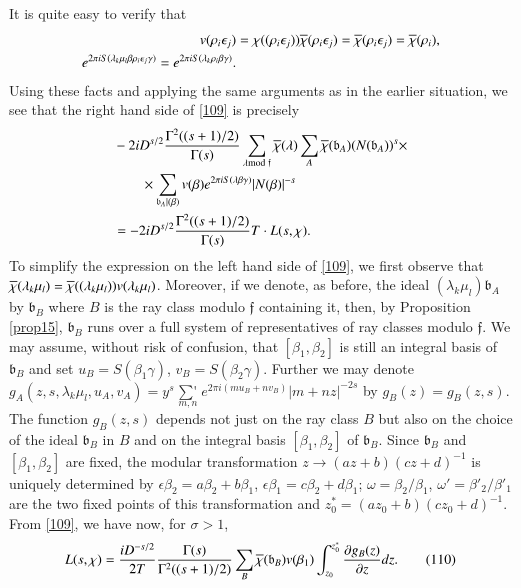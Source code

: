 It is quite easy to verify that
\begin{align*}
v(\rho_{i}\epsilon_{j}) &=
\chi((\rho_{i}\epsilon_{j}))\overline{\chi}(\rho_{i}\epsilon_{j})=\overline{\chi}(\rho_{i}\epsilon_{j})=\overline{\chi}(\rho_{i}),\\
e^{2\pi iS(\lambda_{k}\mu_{l}\beta\rho_{i}\epsilon_{j}\gamma)}=e^{2\pi
  iS(\lambda_{k}\rho_{i}\beta\gamma)}. 
\end{align*}
Using these facts and applying the same arguments as in the earlier
situation, we see that the right hand side of \eqref{109} is precisely
\begin{align*}
& -2iD^{s/2}\frac{\Gamma^{2}((s+1)/2)}{\Gamma(s)}\sum_{\lambda\rm{mod} \;
  \mathfrak{f}}\overline{\chi}(\lambda)\sum_{A}\overline{\chi}(\mathfrak{b}_{A})(N(\mathfrak{b}_{A}))^{s}\times\\
&\qquad \times\sum_{\mathfrak{b}_{A}|(\beta)}v(\beta)e^{2\pi
    iS(\lambda\beta\gamma)}|N(\beta)|^{-s}\\
&=-2iD^{s/2}\frac{\Gamma^{2}((s+1)/2)}{\Gamma(s)}T\cdot L(s,\chi).
\end{align*}\pageoriginale
To simplify the expression on the left hand side of \eqref{109}, we
first observe that
$\overline{\chi}(\lambda_{k}\mu_{l})=\overline{\chi}((\lambda_{k}\mu_{l}))v(\lambda_{k}\mu_{l})$. Moreover,
if we denote, as before, the ideal
$(\lambda_{k}\mu_{l})\mathfrak{b}_{A}$ by $\mathfrak{b}_{B}$ where $B$
is the ray class modulo $\mathfrak{f}$ containing it, then, by
Proposition \ref{prop15}, $\mathfrak{b}_{B}$ runs over a full system
of representatives of ray classes modulo $\mathfrak{f}$. We may
assume, without risk of confusion, that $[\beta_{1},\beta_{2}]$ is
still an integral basis of $\mathfrak{b}_{B}$ and set
$u_{B}=S(\beta_{1}\gamma)$, $v_{B}=S(\beta_{2}\gamma)$. Further we may
denote
$g_{A}(z,s,\lambda_{k}\mu_{l},u_{A},v_{A})=y^{s}\mathop{{\sum}'}\limits_{m,n}e^{2\pi
  i(mu_{B}+nv_{B})}|m+nz|^{-2s}$ by $g_{B}(z)=g_{B}(z,s)$. The
function $g_{B}(z,s)$ depends not just on the ray class $B$ but also
on the choice of the ideal $\mathfrak{b}_{B}$ in $B$ and on the
integral basis $[\beta_{1},\beta_{2}]$ of $\mathfrak{b}_{B}$. Since
$\mathfrak{b}_{B}$ and $[\beta_{1},\beta_{2}]$ are fixed, the modular
transformation $z\to (az+b)(cz+d)^{-1}$ is uniquely determined by
$\epsilon\beta_{2}=a\beta_{2}+b\beta_{1}$,
$\epsilon\beta_{1}=c\beta_{2}+d\beta_{1}$;
$\omega=\beta_{2}/\beta_{1}$, $\omega'=\beta'_{2}/\beta'_{1}$ are the
two fixed points of this transformation and
$z^{\ast}_{0}=(az_{0}+b)(cz_{0}+d)^{-1}$. From \eqref{109}, we have
now, for $\sigma>1$,
\begin{equation*}
L(s,\chi)=\frac{iD^{-s/2}}{2T}\frac{\Gamma(s)}{\Gamma^{2}((s+1)/2)}\sum_{B}\overline{\chi}(\mathfrak{b}_{B})v(\beta_{1})\int^{z^{\ast}_{0}}_{z_{0}}\frac{\partial
    g_{B}(z)}{\partial z}dz.\tag{110}\label{110}
\end{equation*}

